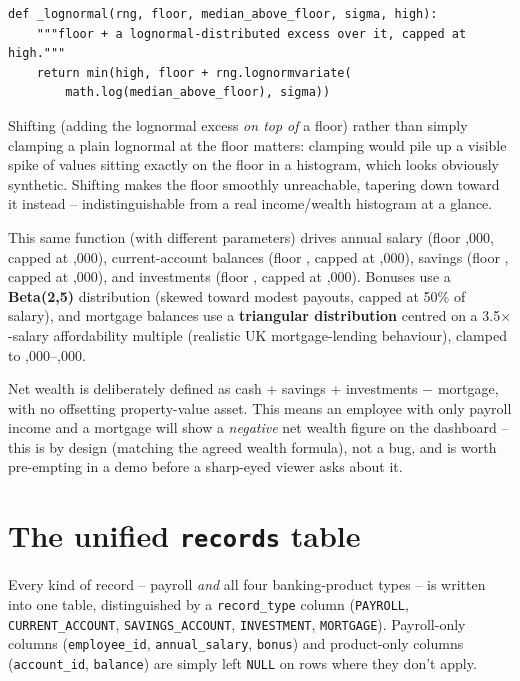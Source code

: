 \documentclass[11pt]{report}
\newcommand{\code}[1]{\lstinline[style=plain]!#1!}
\begin{document}
\begin{lstlisting}[style=py, caption={Shifted lognormal sampler (\texttt{data\_generator.py})}]
def _lognormal(rng, floor, median_above_floor, sigma, high):
    """floor + a lognormal-distributed excess over it, capped at high."""
    return min(high, floor + rng.lognormvariate(
        math.log(median_above_floor), sigma))
\end{lstlisting}

\begin{engbox}
Shifting (adding the lognormal excess \emph{on top of} a floor) rather than simply clamping a plain lognormal at the floor matters: clamping would pile up a visible spike of values sitting exactly on the floor in a histogram, which looks obviously synthetic. Shifting makes the floor smoothly unreachable, tapering down toward it instead -- indistinguishable from a real income/wealth histogram at a glance.
\end{engbox}

This same function (with different parameters) drives annual salary (floor ,000, capped at ,000), current-account balances (floor , capped at ,000), savings (floor , capped at ,000), and investments (floor , capped at ,000). Bonuses use a \textbf{Beta(2,5)} distribution (skewed toward modest payouts, capped at 50\% of salary), and mortgage balances use a \textbf{triangular distribution} centred on a 3.5$\times$-salary affordability multiple (realistic UK mortgage-lending behaviour), clamped to ,000--,000.

\begin{bizbox}
Net wealth is deliberately defined as cash + savings + investments $-$ mortgage, with no offsetting property-value asset. This means an employee with only payroll income and a mortgage will show a \emph{negative} net wealth figure on the dashboard -- this is by design (matching the agreed wealth formula), not a bug, and is worth pre-empting in a demo before a sharp-eyed viewer asks about it.
\end{bizbox}

\section{The unified \texttt{records} table}

Every kind of record -- payroll \emph{and} all four banking-product types -- is written into one table, distinguished by a \code{record_type} column (\code{PAYROLL}, \code{CURRENT_ACCOUNT}, \code{SAVINGS_ACCOUNT}, \code{INVESTMENT}, \code{MORTGAGE}). Payroll-only columns (\code{employee_id}, \code{annual_salary}, \code{bonus}) and product-only columns (\code{account_id}, \code{balance}) are simply left \code{NULL} on rows where they don't apply.
\end{document}
